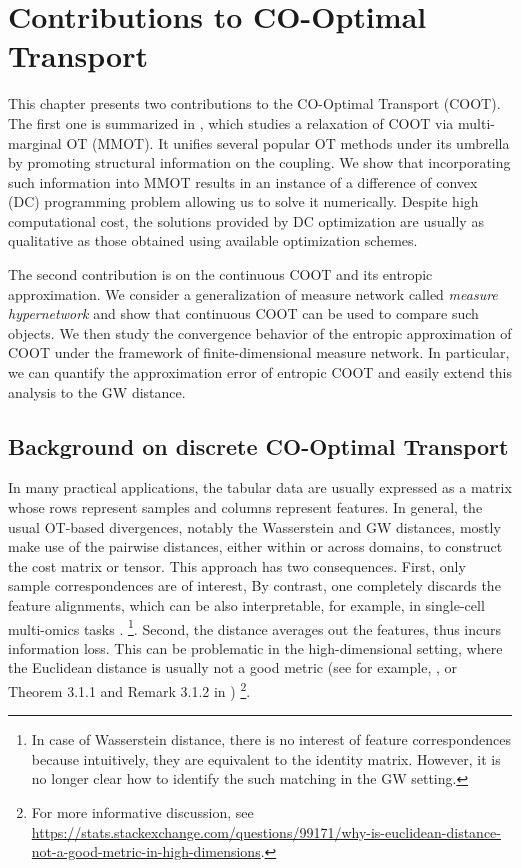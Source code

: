 
\chapter[Contributions to CO-Optimal Transport]{Contributions to CO-Optimal Transport}
\label{chap:coot}

\renewcommand{\contentsname}{Contents}
\localtableofcontents*
{}

\hfill \break
This chapter presents two contributions to the CO-Optimal Transport (COOT).
The first one is summarized in \citep{Tran21},
which studies a relaxation of COOT via multi-marginal OT (MMOT).
It unifies several popular OT methods under its umbrella by promoting structural information
on the coupling. We show that incorporating such information into MMOT results in an
instance of a difference of convex (DC) programming problem allowing us to solve it numerically.
Despite high computational cost, the solutions provided by DC optimization are usually
as qualitative as those obtained using available optimization schemes.

The second contribution is on the continuous COOT and its entropic approximation.
We consider a generalization of measure network called \textit{measure hypernetwork}
and show that continuous COOT can be used to compare such objects.
We then study the convergence behavior of the entropic approximation of COOT
under the framework of finite-dimensional measure network. In particular,
we can quantify the approximation error of entropic COOT and
easily extend this analysis to the GW distance.

\raggedbottom

\section{Background on discrete CO-Optimal Transport}

In many practical applications, the tabular data are usually expressed as a matrix whose rows
represent samples and columns represent features.
In general, the usual OT-based divergences, notably the Wasserstein and GW distances, mostly make
use of the pairwise distances, either within or across domains, to construct the cost matrix
or tensor. This approach has two consequences. First, only sample correspondences are of interest,
By contrast, one completely discards the feature alignments, which can be also interpretable,
for example, in single-cell multi-omics tasks \citep{Demetci20b}.
\footnote{In case of Wasserstein distance, there is no interest of feature correspondences
because intuitively, they are equivalent to the identity matrix. However,
it is no longer clear how to identify the such matching in the GW setting.}.
Second, the distance averages out the features, thus incurs information loss.
This can be problematic in the high-dimensional setting,
where the Euclidean distance is usually not a good metric
(see for example, \citep{Aggarwal01}, or Theorem 3.1.1 and Remark 3.1.2 in \citep{Vershynin18})
\footnote{For more informative discussion,
see \url{https://stats.stackexchange.com/questions/99171/why-is-euclidean-distance-not-a-good-metric-in-high-dimensions}.}.

